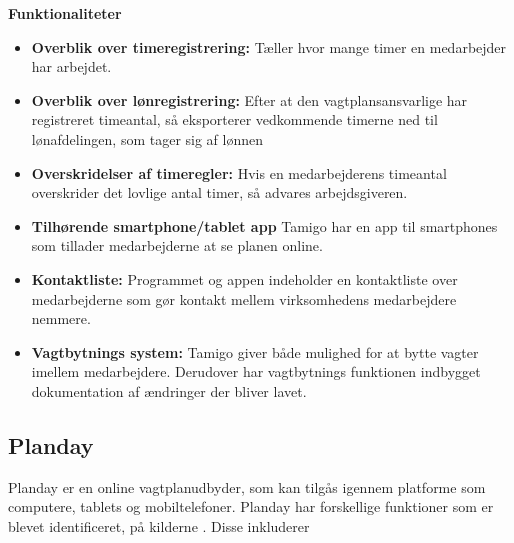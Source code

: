 \textbf{Funktionaliteter}
\begin{itemize}
\item {\textbf{Overblik over timeregistrering:} Tæller hvor mange timer en medarbejder har arbejdet.}
\item {\textbf{Overblik over lønregistrering:} Efter at den vagtplansansvarlige har registreret timeantal, så eksporterer vedkommende timerne ned til lønafdelingen, som tager sig af lønnen} 
\item {\textbf{Overskridelser af timeregler:} Hvis en medarbejderens timeantal overskrider det lovlige antal timer, så advares arbejdsgiveren.}
\item {\textbf{Tilhørende smartphone/tablet app} Tamigo har en app til smartphones som tillader medarbejderne at se planen online.}
\item {\textbf{Kontaktliste:} Programmet og appen indeholder en kontaktliste over medarbejderne som gør kontakt mellem virksomhedens medarbejdere nemmere.}
\item {\textbf{Vagtbytnings system:} Tamigo giver både mulighed for at bytte vagter imellem medarbejdere. Derudover har vagtbytnings funktionen indbygget dokumentation af ændringer der bliver lavet.}
\end{itemize}

\subsection{Planday}
Planday er en online vagtplanudbyder, som kan tilgås igennem platforme som computere, tablets og mobiltelefoner. Planday har forskellige funktioner som er blevet identificeret, på kilderne \citep{DanskInternetHandel, Simonsen2014, Planday, Play, Play}. Disse inkluderer\\

